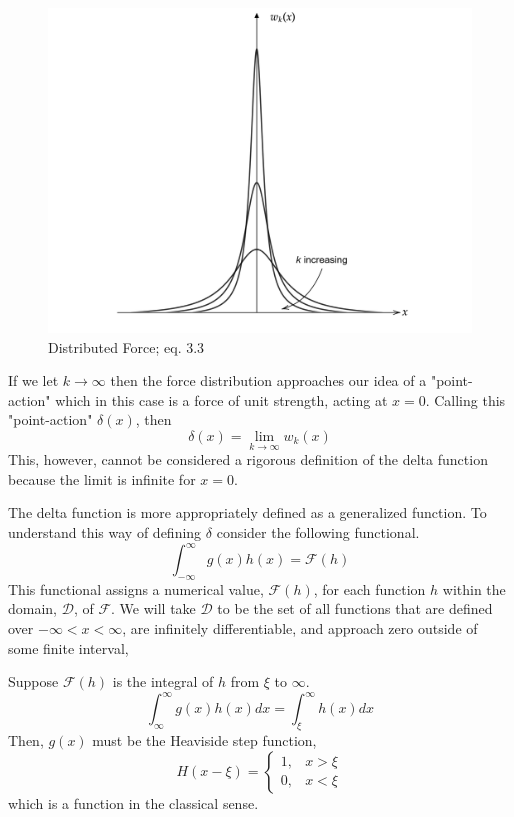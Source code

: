 \begin{figure}[H]
    \centering
    \includegraphics[width=0.7\linewidth]{3.2.png}
    \caption{Distributed Force;  eq. 3.3}
\end{figure}

If we let \(k \rightarrow \infty\) then the force distribution approaches our idea of a "point-action" which in this case is a force of unit strength, acting at \(x=0\). Calling this "point-action" \(\delta(x)\), then
\begin{equation}
    \delta(x) = \lim_{k\rightarrow \infty} w_k(x)
\end{equation}
This, however, cannot be considered a rigorous definition of the delta function because the limit is infinite for \(x=0\). 

The delta function is more appropriately defined as a generalized function. To understand this way of defining \(\delta\) consider the following functional.
\begin{equation}
    \int_{-\infty}^{\infty} g(x)h(x) = \mathcal{F}(h)
\end{equation}
This functional assigns a numerical value, \(\mathcal{F}(h)\), for each function \(h\) within the domain, \(\mathcal{D}\), of \(\mathcal{F}\). We will take \(\mathcal{D}\) to be the set of all functions that are defined over \(-\infty <x<\infty\), are infinitely differentiable, and approach zero outside of some finite interval,

Suppose \(\mathcal{F}(h)\) is the integral of \(h\) from \(\xi\) to \(\infty\).
\begin{equation}
    \int_{\infty}^{\infty} g(x)h(x)dx = \int_{\xi}^{\infty} h(x) dx
\end{equation}
Then, \(g(x)\) must be the Heaviside step function,
\begin{equation}
    H(x-\xi) = \begin{cases}
        1, & x>\xi\\
        0, & x<\xi
    \end{cases}
\end{equation}
which is a function in the classical sense.

